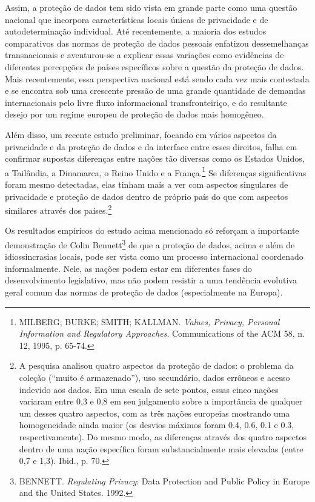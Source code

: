 Assim, a proteção de dados tem sido vista em grande parte como uma
questão nacional que incorpora características locais únicas de
privacidade e de autodeterminação individual. Até recentemente, a
maioria dos estudos comparativos das normas de proteção de dados
pessoais enfatizou dessemelhanças transnacionais e aventurou-se a
explicar essas variações como evidências de diferentes percepções de
países específicos sobre a questão da proteção de dados. Mais
recentemente, essa perspectiva nacional está sendo cada vez mais
contestada e se encontra sob uma crescente pressão de uma grande
quantidade de demandas internacionais pelo livre fluxo informacional
transfronteiriço, e do resultante desejo por um regime europeu de
proteção de dados mais homogêneo.

Além disso, um recente estudo preliminar, focando em vários aspectos da
privacidade e da proteção de dados e da interface entre esses direitos,
falha em confirmar supostas diferenças entre nações tão diversas como os
Estados Unidos, a Tailândia, a Dinamarca, o Reino Unido e a
França.\footnote{MILBERG; BURKE; SMITH; KALLMAN. \emph{Values, Privacy,
  Personal Information and Regulatory Approaches}. Communications of the
  ACM 58, n. 12, 1995, p. 65-74.} Se diferenças significativas foram
mesmo detectadas, elas tinham mais a ver com aspectos singulares de
privacidade e proteção de dados dentro de próprio país do que com
aspectos similares através dos países.\footnote{A pesquisa analisou
  quatro aspectos da proteção de dados: o problema da coleção (``muito é
  armazenado''), uso secundário, dados errôneos e acesso indevido aos
  dados. Em uma escala de sete pontos, essas cinco nações variaram entre
  0,3 e 0,8 em seu julgamento sobre a importância de qualquer um desses
  quatro aspectos, com as três nações europeias mostrando uma
  homogeneidade ainda maior (os desvios máximos foram 0.4, 0.6, 0.1 e
  0.3, respectivamente). Do mesmo modo, as diferenças através dos quatro
  aspectos dentro de uma nação específica foram substancialmente mais
  elevadas (entre 0,7 e 1,3). Ibid., p. 70.}

Os resultados empíricos do estudo acima mencionado só reforçam a
importante demonstração de Colin Bennett\footnote{BENNETT.
  \emph{Regulating Privacy}: Data Protection and Public Policy in Europe
  and the United States. 1992.} de que a proteção de dados, acima e além
de idiossincrasias locais, pode ser vista como um processo internacional
coordenado informalmente. Nele, as nações podem estar em diferentes
fases do desenvolvimento legislativo, mas não podem resistir a uma
tendência evolutiva geral comum das normas de proteção de dados
(especialmente na Europa).

